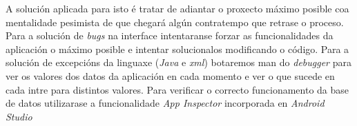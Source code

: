 A solución aplicada para isto é tratar de adiantar o proxecto máximo posible coa mentalidade pesimista de que chegará algún contratempo que retrase o proceso.\\

Para a solución de \textit{bugs} na interface intentaranse forzar as funcionalidades da aplicación o máximo posible e intentar solucionalos modificando o código. Para a solución de excepcións da linguaxe (\textit{Java} e \textit{xml}) botaremos man do \textit{debugger} para ver os valores dos datos da aplicación en cada momento e ver o que sucede en cada intre para distintos valores. Para verificar o correcto funcionamento da base de datos utilizarase a funcionalidade \textit{App Inspector} incorporada en \textit{Android Studio}

 \let\cleardoublepage=\clearpage 